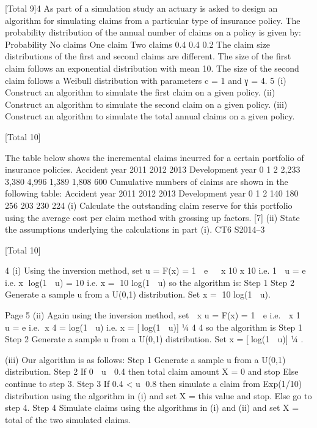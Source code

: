 \documentclass[a4paper,12pt]{article}
\begin{document}
\begin{enumerate}

[Total 9]4
As part of a simulation study an actuary is asked to design an algorithm for simulating
claims from a particular type of insurance policy. The probability distribution of the
annual number of claims on a policy is given by:
Probability
No claims One claim Two claims
0.4 0.4 0.2
The claim size distributions of the first and second claims are different. The size of
the first claim follows an exponential distribution with mean 10. The size of the
second claim follows a Weibull distribution with parameters c = 1 and γ = 4.
5
(i) Construct an algorithm to simulate the first claim on a given policy. 
(ii) Construct an algorithm to simulate the second claim on a given policy. 
(iii) Construct an algorithm to simulate the total annual claims on a given policy.

[Total 10]



The table below shows the incremental claims incurred for a certain portfolio of
insurance policies.
Accident year
2011
2012
2013
Development year
0
1
2
2,233
3,380
4,996
1,389
1,808
600
Cumulative numbers of claims are shown in the following table:
Accident year
2011
2012
2013
Development year
0
1
2
140
180
256
203
230
224
(i) Calculate the outstanding claim reserve for this portfolio using the average
cost per claim method with grossing up factors.
[7]
(ii) State the assumptions underlying the calculations in part (i).
CT6 S2014–3

[Total 10]

4
(i)
Using the inversion method, set
u = F(x) = 1  e


x
10
x
10
i.e. 1  u = e
i.e. x
log(1  u) = 10
i.e. x = 10 log(1  u)
so the algorithm is:
Step 1
Step 2
Generate a sample u from a U(0,1) distribution.
Set x = 10 log(1  u).

Page 5%
(ii)
Again using the inversion method, set
 x
u = F(x) = 1  e
i.e.  x
1  u = e
i.e. x 4 = log(1  u)
i.e. x = [log(1  u)] 1⁄4
4
4
so the algorithm is
Step 1
Step 2
Generate a sample u from a U(0,1) distribution.
Set x = [log(1  u)] 1⁄4 .

(iii)
Our algorithm is as follows:
Step 1 Generate a sample u from a U(0,1) distribution.
Step 2 If 0  u  0.4 then total claim amount X = 0 and stop
Else continue to step 3.
Step 3 If 0.4 < u 0.8 then simulate a claim from Exp(1/10)
distribution using the algorithm in (i) and set X = this value
and stop.
Else go to step 4.
Step 4
Simulate claims using the algorithms in (i) and (ii) and set
X = total of the two simulated claims.


\end{enumerate}
\end{document}
